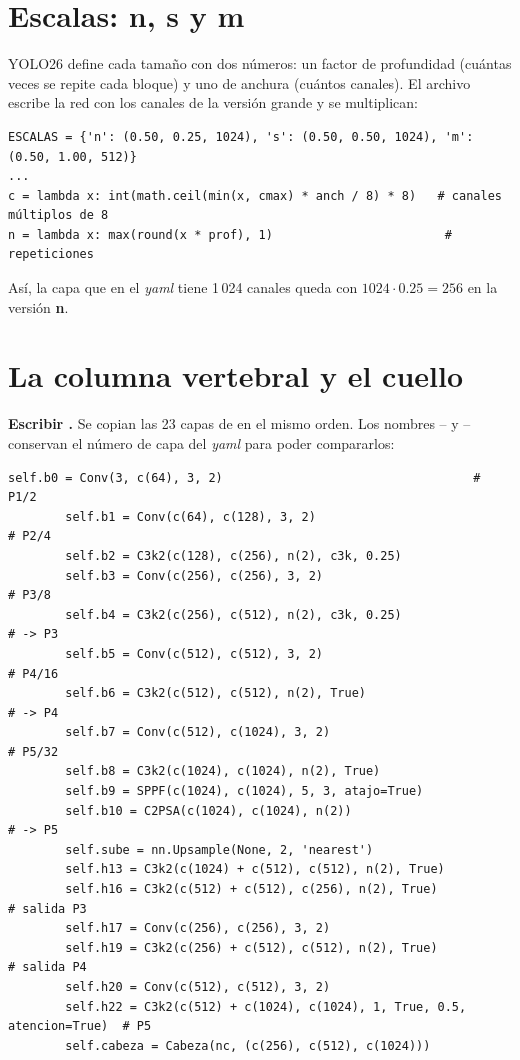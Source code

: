 \section{Escalas: n, s y m}

YOLO26 define cada tamaño con dos números: un factor de profundidad (cuántas
veces se repite cada bloque) y uno de anchura (cuántos canales). El archivo
 escribe la red con los canales de la versión grande y se
multiplican:

\begin{lstlisting}[style=py]
ESCALAS = {'n': (0.50, 0.25, 1024), 's': (0.50, 0.50, 1024), 'm': (0.50, 1.00, 512)}
...
c = lambda x: int(math.ceil(min(x, cmax) * anch / 8) * 8)   # canales múltiplos de 8
n = lambda x: max(round(x * prof), 1)                        # repeticiones
\end{lstlisting}

Así, la capa que en el \emph{yaml} tiene 1\,024 canales queda con
$1024\cdot0.25 = 256$ en la versión \textbf{n}.

\section{La columna vertebral y el cuello}

 \textbf{Escribir .}
Se copian las 23 capas de  en el mismo orden. Los nombres
-- y -- conservan el número de capa del
\emph{yaml} para poder compararlos:

\begin{lstlisting}[style=py]
        self.b0 = Conv(3, c(64), 3, 2)                                   # P1/2
        self.b1 = Conv(c(64), c(128), 3, 2)                              # P2/4
        self.b2 = C3k2(c(128), c(256), n(2), c3k, 0.25)
        self.b3 = Conv(c(256), c(256), 3, 2)                             # P3/8
        self.b4 = C3k2(c(256), c(512), n(2), c3k, 0.25)                  # -> P3
        self.b5 = Conv(c(512), c(512), 3, 2)                             # P4/16
        self.b6 = C3k2(c(512), c(512), n(2), True)                       # -> P4
        self.b7 = Conv(c(512), c(1024), 3, 2)                            # P5/32
        self.b8 = C3k2(c(1024), c(1024), n(2), True)
        self.b9 = SPPF(c(1024), c(1024), 5, 3, atajo=True)
        self.b10 = C2PSA(c(1024), c(1024), n(2))                         # -> P5
        self.sube = nn.Upsample(None, 2, 'nearest')
        self.h13 = C3k2(c(1024) + c(512), c(512), n(2), True)
        self.h16 = C3k2(c(512) + c(512), c(256), n(2), True)             # salida P3
        self.h17 = Conv(c(256), c(256), 3, 2)
        self.h19 = C3k2(c(256) + c(512), c(512), n(2), True)             # salida P4
        self.h20 = Conv(c(512), c(512), 3, 2)
        self.h22 = C3k2(c(512) + c(1024), c(1024), 1, True, 0.5, atencion=True)  # P5
        self.cabeza = Cabeza(nc, (c(256), c(512), c(1024)))
\end{lstlisting}

